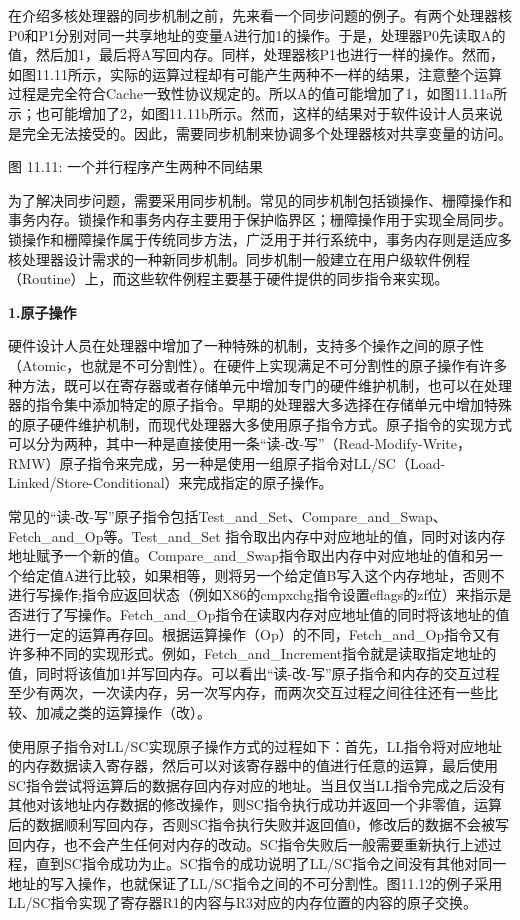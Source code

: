 \documentclass[]{ctexbook}
\begin{document}
在介绍多核处理器的同步机制之前，先来看一个同步问题的例子。有两个处理器核P0和P1分别对同一共享地址的变量A进行加1的操作。于是，处理器P0先读取A的值，然后加1，最后将A写回内存。同样，处理器核P1也进行一样的操作。然而，如图11.11所示，实际的运算过程却有可能产生两种不一样的结果，注意整个运算过程是完全符合Cache一致性协议规定的。所以A的值可能增加了1，如图11.11a所示；也可能增加了2，如图11.11b所示。然而，这样的结果对于软件设计人员来说是完全无法接受的。因此，需要同步机制来协调多个处理器核对共享变量的访问。

图 11.11: 一个并行程序产生两种不同结果

为了解决同步问题，需要采用同步机制。常见的同步机制包括锁操作、栅障操作和事务内存。锁操作和事务内存主要用于保护临界区；栅障操作用于实现全局同步。锁操作和栅障操作属于传统同步方法，广泛用于并行系统中，事务内存则是适应多核处理器设计需求的一种新同步机制。同步机制一般建立在用户级软件例程（Routine）上，而这些软件例程主要基于硬件提供的同步指令来实现。

\textbf{1.原子操作}

硬件设计人员在处理器中增加了一种特殊的机制，支持多个操作之间的原子性（Atomic，也就是不可分割性）。在硬件上实现满足不可分割性的原子操作有许多种方法，既可以在寄存器或者存储单元中增加专门的硬件维护机制，也可以在处理器的指令集中添加特定的原子指令。早期的处理器大多选择在存储单元中增加特殊的原子硬件维护机制，而现代处理器大多使用原子指令方式。原子指令的实现方式可以分为两种，其中一种是直接使用一条``读-改-写''（Read-Modify-Write，RMW）原子指令来完成，另一种是使用一组原子指令对LL/SC（Load-Linked/Store-Conditional）来完成指定的原子操作。

常见的``读-改-写''原子指令包括Test\_and\_Set、Compare\_and\_Swap、Fetch\_and\_Op等。Test\_and\_Set 指令取出内存中对应地址的值，同时对该内存地址赋予一个新的值。Compare\_and\_Swap指令取出内存中对应地址的值和另一个给定值A进行比较，如果相等，则将另一个给定值B写入这个内存地址，否则不进行写操作;指令应返回状态（例如X86的cmpxchg指令设置eflags的zf位）来指示是否进行了写操作。Fetch\_and\_Op指令在读取内存对应地址值的同时将该地址的值进行一定的运算再存回。根据运算操作（Op）的不同，Fetch\_and\_Op指令又有许多种不同的实现形式。例如，Fetch\_and\_Increment指令就是读取指定地址的值，同时将该值加1并写回内存。可以看出``读-改-写''原子指令和内存的交互过程至少有两次，一次读内存，另一次写内存，而两次交互过程之间往往还有一些比较、加减之类的运算操作（改）。

使用原子指令对LL/SC实现原子操作方式的过程如下：首先，LL指令将对应地址的内存数据读入寄存器，然后可以对该寄存器中的值进行任意的运算，最后使用SC指令尝试将运算后的数据存回内存对应的地址。当且仅当LL指令完成之后没有其他对该地址内存数据的修改操作，则SC指令执行成功并返回一个非零值，运算后的数据顺利写回内存，否则SC指令执行失败并返回值0，修改后的数据不会被写回内存，也不会产生任何对内存的改动。SC指令失败后一般需要重新执行上述过程，直到SC指令成功为止。SC指令的成功说明了LL/SC指令之间没有其他对同一地址的写入操作，也就保证了LL/SC指令之间的不可分割性。图11.12的例子采用LL/SC指令实现了寄存器R1的内容与R3对应的内存位置的内容的原子交换。
\end{document}
